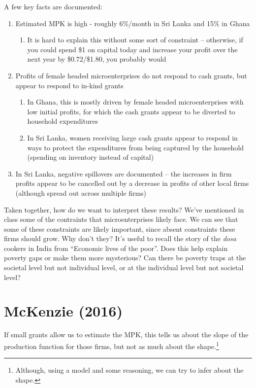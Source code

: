 \documentclass[12pt,english]{article}
\begin{document}
A few key facts are documented:
\begin{enumerate}
	\item Estimated MPK is high - roughly 6\%/month in Sri Lanka and 15\% in Ghana
	\begin{enumerate}
		\item It is hard to explain this without some sort of constraint -- otherwise, if you could spend \$1 on capital today and increase your profit over the next year by \$0.72/\$1.80, you probably would
	\end{enumerate}
	\item Profits of female headed microenterprises do not respond to cash grants, but appear to respond to in-kind grants
	\begin{enumerate}
		\item In Ghana, this is mostly driven by female headed microenterprises with low initial profits, for which the cash grants appear to be diverted to household expenditures
		\item In Sri Lanka, women receiving large cash grants appear to respond in ways to protect the expenditures from being captured by the household (spending on inventory instead of capital)
	\end{enumerate}
	\item In Sri Lanka, negative spillovers are documented -- the increases in firm profits appear to be cancelled out by a decrease in profits of other local firms (although spread out across multiple firms)
\end{enumerate}

Taken together, how do we want to interpret these results? We've mentioned in class some of the contraints that microenterprises likely face. We can see that some of these constraints are likely important, since absent constraints these firms should grow. Why don't they? It's useful to recall the story of the \textit{dosa} cookers in India from ``Economic lives of the poor''. Does this help explain poverty gaps or make them more mysterious? Can there be poverty traps at the societal level but not individual level, or at the individual level but not societal level?

\section{McKenzie (2016)}

If small grants allow us to estimate the MPK, this tells us about the slope of the production function for those firms, but not as much about the shape.\footnote{Although, using a model and some reasoning, we can try to infer about the shape.}
\end{document}
